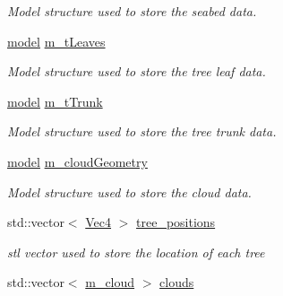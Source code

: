 \begin{DoxyCompactItemize}
\begin{DoxyCompactList}\small\item\em Model structure used to store the seabed data. \item\end{DoxyCompactList}\item 
\hypertarget{classPlanet_af501ae7a43df5b1630d30eb27cdb372b}{
\hyperlink{structmodel}{model} \hyperlink{classPlanet_af501ae7a43df5b1630d30eb27cdb372b}{m\_\-tLeaves}}
\label{classPlanet_af501ae7a43df5b1630d30eb27cdb372b}

\begin{DoxyCompactList}\small\item\em Model structure used to store the tree leaf data. \item\end{DoxyCompactList}\item 
\hypertarget{classPlanet_a52be42c94405bfdc71aee6569f28c2ce}{
\hyperlink{structmodel}{model} \hyperlink{classPlanet_a52be42c94405bfdc71aee6569f28c2ce}{m\_\-tTrunk}}
\label{classPlanet_a52be42c94405bfdc71aee6569f28c2ce}

\begin{DoxyCompactList}\small\item\em Model structure used to store the tree trunk data. \item\end{DoxyCompactList}\item 
\hypertarget{classPlanet_a1d591cb3f32e88fb5dc3dcb9de7e9f9f}{
\hyperlink{structmodel}{model} \hyperlink{classPlanet_a1d591cb3f32e88fb5dc3dcb9de7e9f9f}{m\_\-cloudGeometry}}
\label{classPlanet_a1d591cb3f32e88fb5dc3dcb9de7e9f9f}

\begin{DoxyCompactList}\small\item\em Model structure used to store the cloud data. \item\end{DoxyCompactList}\item 
\hypertarget{classPlanet_ad2b3fdf33c8b9bf277e204dcb9ccd151}{
std::vector$<$ \hyperlink{classVec4}{Vec4} $>$ \hyperlink{classPlanet_ad2b3fdf33c8b9bf277e204dcb9ccd151}{tree\_\-positions}}
\label{classPlanet_ad2b3fdf33c8b9bf277e204dcb9ccd151}

\begin{DoxyCompactList}\small\item\em stl vector used to store the location of each tree \item\end{DoxyCompactList}\item 
\hypertarget{classPlanet_a6b0ca9d5a52bb111d70d4f78a6e35300}{
std::vector$<$ \hyperlink{structPlanet_1_1m__cloud}{m\_\-cloud} $>$ \hyperlink{classPlanet_a6b0ca9d5a52bb111d70d4f78a6e35300}{clouds}}
\label{classPlanet_a6b0ca9d5a52bb111d70d4f78a6e35300}


\end{DoxyCompactItemize}
